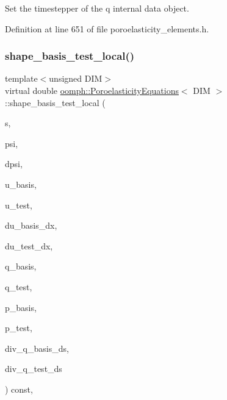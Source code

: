 Set the timestepper of the q internal data object. 



Definition at line 651 of file poroelasticity\+\_\+elements.\+h.

\mbox{\label{classoomph_1_1PoroelasticityEquations_a14fa3f0b43c4d7da65504702aef760bf}} 
\subsubsection{\texorpdfstring{shape\+\_\+basis\+\_\+test\+\_\+local()}{shape\_basis\_test\_local()}}
{\footnotesize\ttfamily template$<$unsigned D\+IM$>$ \\
virtual double \hyperlink{classoomph_1_1PoroelasticityEquations}{oomph\+::\+Poroelasticity\+Equations}$<$ D\+IM $>$\+::shape\+\_\+basis\+\_\+test\+\_\+local (\begin{DoxyParamCaption}\item[{const \hyperlink{classoomph_1_1Vector}{Vector}$<$ double $>$ \&}]{s,  }\item[{\hyperlink{classoomph_1_1Shape}{Shape} \&}]{psi,  }\item[{\hyperlink{classoomph_1_1DShape}{D\+Shape} \&}]{dpsi,  }\item[{\hyperlink{classoomph_1_1Shape}{Shape} \&}]{u\+\_\+basis,  }\item[{\hyperlink{classoomph_1_1Shape}{Shape} \&}]{u\+\_\+test,  }\item[{\hyperlink{classoomph_1_1DShape}{D\+Shape} \&}]{du\+\_\+basis\+\_\+dx,  }\item[{\hyperlink{classoomph_1_1DShape}{D\+Shape} \&}]{du\+\_\+test\+\_\+dx,  }\item[{\hyperlink{classoomph_1_1Shape}{Shape} \&}]{q\+\_\+basis,  }\item[{\hyperlink{classoomph_1_1Shape}{Shape} \&}]{q\+\_\+test,  }\item[{\hyperlink{classoomph_1_1Shape}{Shape} \&}]{p\+\_\+basis,  }\item[{\hyperlink{classoomph_1_1Shape}{Shape} \&}]{p\+\_\+test,  }\item[{\hyperlink{classoomph_1_1Shape}{Shape} \&}]{div\+\_\+q\+\_\+basis\+\_\+ds,  }\item[{\hyperlink{classoomph_1_1Shape}{Shape} \&}]{div\+\_\+q\+\_\+test\+\_\+ds }\end{DoxyParamCaption}) const\hspace{0.3cm}{\ttfamily [protected]}, {}}



